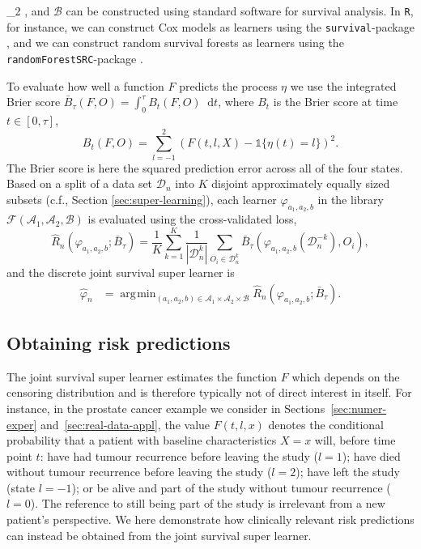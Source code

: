 \documentclass[lineno]{biometrika}
\renewcommand{\phi}{\varphi}
\newcommand*\diff{\mathop{}\!\mathrm{d}}
\newcommand{\1}{\mathds{1}}
\DeclareMathOperator*{\argmin}{\arg\!\min}
\newcommand{\data}{\ensuremath{\mathcal{D}}}
\begin{document}
_2 \), and \( \mathcal{B} \) can be constructed using
standard software for survival analysis. In
\texttt{R}, for instance, we can construct Cox models as
learners using the \texttt{survival}-package
\citep{survival-package}, and we can construct random survival
forests as learners using the \texttt{randomForestSRC}-package \citep{randomForestSRC}.

To evaluate how well a function \( F \) predicts the
process $\eta$ we use the integrated Brier score \citep{graf1999assessment}
\( \bar B_\tau( F,O) = \int_0^{\tau} B_t(F,O) \diff t \),
where \( B_t \) is the Brier score
\citep{brier1950verification} at time \( t \in [0, \tau] \),
\begin{equation*}
  B_t(F,O) = \sum_{l=-1}^{2}
  \left(
      F(t,l,X) - \1{\{\eta(t)=l\}}
  \right)^2.
\end{equation*}
The Brier score is here the squared prediction error across
all of the four states. Based on a split of a data set \(\data_n\)
into $K$ disjoint approximately equally sized subsets (c.f., Section
\ref{sec:super-learning}), each learner \( \phi_{a_1, a_2, b} \) in
the library
\( \mathcal{F}(\mathcal{A}_1, \mathcal{A}_2, \mathcal{B}) \) is
evaluated using the cross-validated loss,
\begin{equation*}
  \hat{R}_{n}(\phi_{a_1,a_2,b} ; \bar{B}_{\tau}) =
  \frac{1}{K}\sum_{k=1}^{K}
  \frac{1}{| \data_n^{k} |}\sum_{O_i \in \data_n^{k}}
  \bar B_\tau
  {
    \left(
      \phi_{a_1,a_2,b}{ (\data_n^{-k})}
      , O_i
    \right)
  },
\end{equation*}
and the discrete joint survival super learner is 
\begin{align*}\label{eq:discrete-state-learner}
  \hat{\phi}_n
  &=  \argmin_{(a_1,a_2,b)\in \mathcal{A}_1\times\mathcal{A}_2\times\mathcal{B}}
    \hat{R}_{n}(\phi_{a_1,a_2,b} ; \bar{B}_{\tau}).
\end{align*}




\subsection{Obtaining risk predictions}
\label{sec:use-cases-state}

The joint survival super learner estimates the function \( F \) which
depends on the censoring distribution and is therefore typically not
of direct interest in itself. For instance, in the prostate cancer
example we consider in Sections~\ref{sec:numer-exper}
and~\ref{sec:real-data-appl}, the value \( F(t, l, x) \) denotes the
conditional probability that a patient with baseline characteristics
\( X=x \) will, before time point \( t \): have had tumour recurrence
before leaving the study ($l=1$); have died without tumour recurrence
before leaving the study ($l=2$); have left the study (state $l=-1$);
or be alive and part of the study without tumour recurrence ($l=0$).
The reference to still being part of the study is irrelevant from a
new patient's perspective. We here demonstrate how clinically relevant
risk predictions can instead be obtained from the joint survival super
learner.
\end{document}
